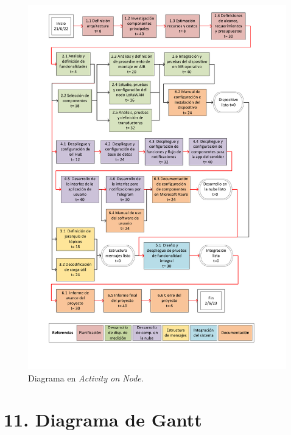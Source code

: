 \documentclass[
11pt, %
]{charter}
\begin{document}
\begin{figure}[htpb]
\centering 
\includegraphics[width=1\textwidth]{./Figuras/Diagrama Activity on node_seleccion.pdf}
\caption{Diagrama en \textit{Activity on Node}.}
\label{fig:AoN}
\end{figure}



\section{11. Diagrama de Gantt}
\label{sec:gantt}

%
%
\end{document}
